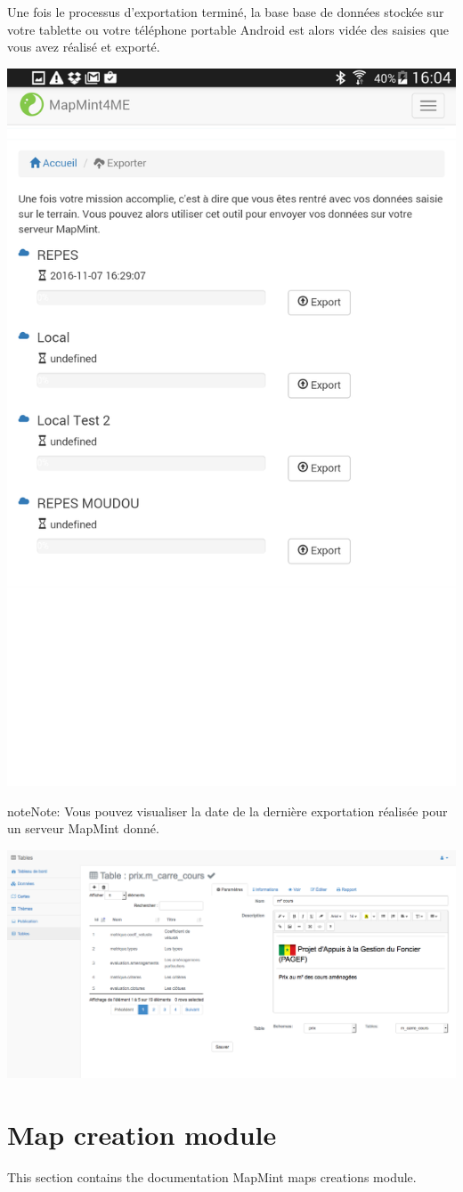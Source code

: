 \documentclass[letterpaper,10pt,english]{sphinxmanual}
\begin{document}
Une fois le processus d'exportation terminé, la base base de données stockée sur votre tablette ou votre téléphone portable Android est alors vidée des saisies que vous avez réalisé et exporté.

{\hfill\includegraphics[width=0.450\linewidth]{mm4me-export.png}\hfill}

\begin{notice}{note}{Note:}
Vous pouvez visualiser la date de la dernière exportation réalisée pour un serveur MapMint donné.
\end{notice}

\includegraphics[width=1.000\linewidth]{table-module-preview.png}


\chapter{Map creation module}
\label{maps/index:maps}\label{maps/index::doc}\label{maps/index:module-de-creation-de-cartes}
This section contains the documentation MapMint maps creations module.
\end{document}
